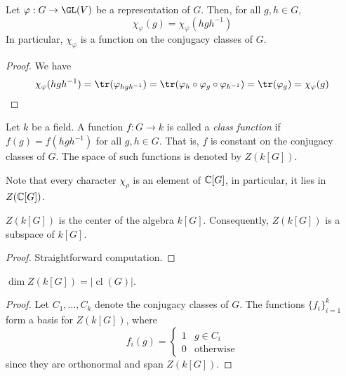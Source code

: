 \begin{proposition}
    Let $\varphi: G\to\GL(V)$ be a representation of $G$. Then, for all $g,h\in G$, 
    \begin{equation*}
        \chi_\varphi(g) = \chi_\varphi(hgh^{-1})
    \end{equation*}
    In particular, $\chi_\varphi$ is a function on the conjugacy classes of $G$.
\end{proposition}
\begin{proof}
    We have 
    \begin{equation*}
        \chi_\varphi(hgh^{-1}) = \tr(\varphi_{hgh^{-1}}) = \tr(\varphi_h\circ\varphi_g\circ\varphi_{h^{-1}}) = \tr(\varphi_g) = \chi_\varphi(g)
    \end{equation*}
\end{proof}


\begin{definition}
    Let $k$ be a field. A function $f: G\to k$ is called a \textit{class function} if $f(g) = f(hgh^{-1})$ for all $g,h\in G$. That is, $f$ is constant on the conjugacy classes of $G$. The space of such functions is denoted by $Z(k[G])$.
\end{definition}

Note that every character $\chi_\rho$ is an element of $\mathbb{C}[G]$, in particular, it lies in $Z(\mathbb{C}[G])$.

\begin{proposition}
    $Z(k[G])$ is the center of the algebra $k[G]$. Consequently, $Z(k[G])$ is a subspace of $k[G]$.
\end{proposition}
\begin{proof}
    Straightforward computation.
\end{proof}

\begin{corollary}
    $\dim Z(k[G]) = |\operatorname{cl}(G)|$.
\end{corollary}
\begin{proof}
    Let $C_1,\ldots,C_k$ denote the conjugacy classes of $G$. The functions $\{f_i\}_{i = 1}^k$ form a basis for $Z(k[G])$, where 
    \begin{equation*}
        f_i(g) = 
        \begin{cases}
            1 & g\in C_i\\
            0 & \text{otherwise}
        \end{cases}
    \end{equation*}
    since they are orthonormal and span $Z(k[G])$.
\end{proof}

